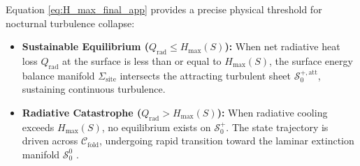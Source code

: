 Equation \eqref{eq:H_max_final_app} provides a precise physical threshold for nocturnal turbulence collapse:
\begin{itemize}
    \item \textbf{Sustainable Equilibrium ($Q_{\mathrm{rad}} \le H_{\max}(S)$):} When net radiative heat loss $Q_{\mathrm{rad}}$ at the surface is less than or equal to $H_{\max}(S)$, the surface energy balance manifold $\Sigma_{\mathrm{site}}$ intersects the attracting turbulent sheet $\mathcal{S}_0^{+,\mathrm{att}}$, sustaining continuous turbulence.
    \item \textbf{Radiative Catastrophe ($Q_{\mathrm{rad}} > H_{\max}(S)$):} When radiative cooling exceeds $H_{\max}(S)$, no equilibrium exists on $\mathcal{S}_0^+$. The state trajectory is driven across $\mathcal{C}_{\mathrm{fold}}$, undergoing rapid transition toward the laminar extinction manifold $\mathcal{S}_0^0$ \citep{VanDeWiel2012, VanHooijdonk2015}.
\end{itemize}
